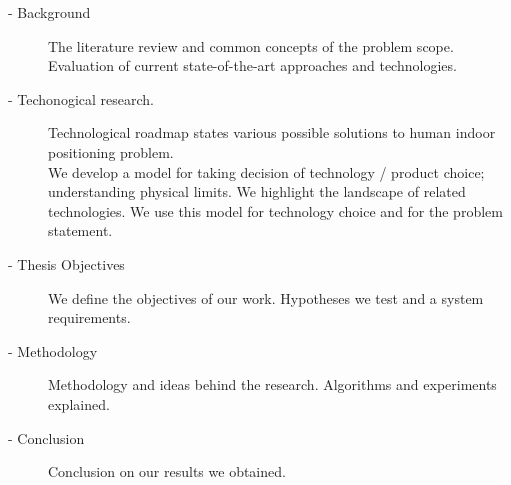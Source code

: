 % 
% 
% 
% 

\begin{description}
    \item[ - Background]
	The literature review and common concepts of the problem scope.
	Evaluation of current state-of-the-art approaches and technologies.

	\item[ - Techonogical research. ]
	Technological roadmap states various possible solutions to human indoor positioning problem. \\
	We develop a model for taking decision of technology / product choice; understanding physical limits. We highlight the landscape of related technologies.
	We use this model for technology choice and for the problem statement.

    \item[ - Thesis Objectives]
	We define the objectives of our work. Hypotheses we test and a system requirements.

	\item[ - Methodology]
	Methodology and ideas behind the research. Algorithms and experiments explained.

    \item[ - Conclusion]
	Conclusion on our results we obtained.


\end{description}

